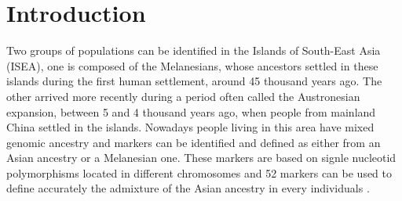 \documentclass[a4paper,12pt]{report}
\begin{document}

\begin{spacing}{1.2}
 \tableofcontents
\end{spacing}

\chapter*{Introduction}
Two groups of populations can be identified in the Islands of South-East Asia (ISEA), one is composed of the Melanesians, whose ancestors settled in these islands during the first human settlement, around 45 thousand years ago. The other arrived more recently during a period often called the Austronesian expansion, between 5 and 4 thousand years ago, when people from mainland China settled in the islands. Nowadays people living in this area have mixed genomic ancestry and markers can be identified and defined as either from an Asian ancestry or a Melanesian one. These markers are based on signle nucleotid polymorphisms located in different chromosomes and 52 markers can be used to define accurately the admixture of the Asian ancestry in every individuals \cite{Cox01}.
\end{document}
